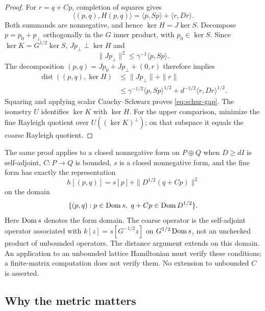 \begin{proof}
For $r=q+Cp$, completion of squares gives
\begin{equation}\label{eq:completion}
 \langle(p,q),H(p,q)\rangle=\langle p,Sp\rangle+\langle r,Dr\rangle.
\end{equation}
Both summands are nonnegative, and hence $\ker H=J\ker S$.
Decompose $p=p_0+p_\perp$ orthogonally in the $G$ inner product,
with $p_0\in\ker S$. Since $\ker K=G^{1/2}\ker S$,
$Jp_\perp\perp\ker H$ and
\[
 \|Jp_\perp\|^2\le \gamma^{-1}\langle p,Sp\rangle.
\]
The decomposition $(p,q)=Jp_0+Jp_\perp+(0,r)$ therefore implies
\begin{align*}
 \operatorname{dist}((p,q),\ker H)
 &\le \|Jp_\perp\|+\|r\|\\
 &\le \gamma^{-1/2}\langle p,Sp\rangle^{1/2}
       +d^{-1/2}\langle r,Dr\rangle^{1/2}.
\end{align*}
Squaring and applying scalar Cauchy--Schwarz proves
\eqref{eq:schur-gap}. The isometry $U$ identifies $\ker K$ with $\ker H$.
For the upper comparison, minimize the fine Rayleigh quotient over
$U((\ker K)^\perp)$; on that subspace it equals the coarse Rayleigh quotient.
\end{proof}

\begin{remark}\label{rem:schur-domain}
The same proof applies to a closed nonnegative form on $P\oplus Q$
when $D\ge dI$ is self-adjoint, $C:P\to Q$ is bounded, $s$ is a closed
nonnegative form, and the fine form has exactly the representation
\[
 h[(p,q)]=s[p]+\|D^{1/2}(q+Cp)\|^2
\]
on the domain
\[
 \{(p,q):p\in\Dom s,\ q+Cp\in\Dom D^{1/2}\}.
\]
Here $\operatorname{Dom} s$ denotes the form domain. The coarse operator is the
self-adjoint operator associated with
$k[z]=s[G^{-1/2}z]$ on $G^{1/2}\operatorname{Dom} s$, not an unchecked product
of unbounded operators. The distance argument extends on this domain.
An application to an unbounded lattice Hamiltonian must verify these
conditions; a finite-matrix computation does not verify them.
No extension to unbounded $C$ is asserted.
\end{remark}

\subsection{Why the metric matters}

